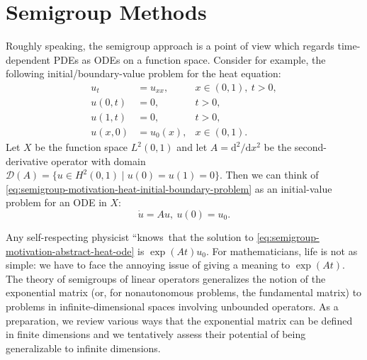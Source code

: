 \section{Semigroup Methods}\label{chap:semigroup-methods}

Roughly speaking, the semigroup approach is a point of view which regards time-dependent PDEs as ODEs on a function space. Consider for example, the following initial/boundary-value problem for the heat equation:
\begin{equation}\label{eq:semigroup-motivation-heat-initial-boundary-problem}
\begin{aligned}u_t&=u_{xx},&x\in(0,1),\ t>0,\\u(0,t)&=0,&t>0,\\u(1,t)&=0,&t>0,\\u(x,0)&=u_0(x),&x\in(0,1).\end{aligned}
\end{equation}
Let $X$ be the function space $L^2(0,1)$ and let $A=\mathrm{d}^2/\mathrm{d}x^2$ be the second-derivative operator with domain $\mathcal{D}(A)=\{u\in H^2(0,1)\mid u(0)=u(1)=0\}$. Then we can think of \eqref{eq:semigroup-motivation-heat-initial-boundary-problem} as an initial-value problem for an ODE in $X$:
\begin{equation}\label{eq:semigroup-motivation-abstract-heat-ode}
\dot u=Au,\ u(0)=u_0.
\end{equation}


Any self-respecting physicist ``knows\textquotesingle\textquotesingle\ that the solution to \eqref{eq:semigroup-motivation-abstract-heat-ode} is $\exp(At)u_0$. For mathematicians, life is not as simple: we have to face the annoying issue of giving a meaning to $\exp(At)$. The theory of semigroups of linear operators generalizes the notion of the exponential matrix (or, for nonautonomous problems, the fundamental matrix) to problems in infinite-dimensional spaces involving unbounded operators. As a preparation, we review various ways that the exponential matrix can be defined in finite dimensions and we tentatively assess their potential of being generalizable to infinite dimensions.

